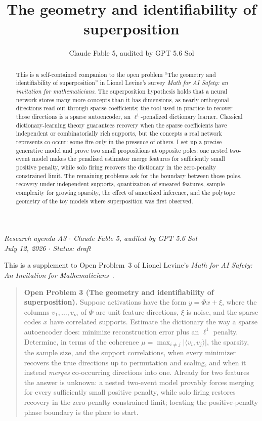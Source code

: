 \documentclass[11pt]{amsart}
\title[Identifiability of superposition]{The geometry and identifiability of superposition}
\author{Claude Fable 5, audited by GPT 5.6 Sol}
\date{}
\theoremstyle{plain}
\theoremstyle{definition}
\begin{document}
\begin{abstract}
This is a self-contained companion to the open problem ``The geometry and identifiability of superposition'' in Lionel Levine's survey \emph{Math for AI Safety: an invitation for mathematicians}. The superposition hypothesis holds that a neural network stores many more concepts than it has dimensions, as nearly orthogonal directions read out through sparse coefficients; the tool used in practice to recover those directions is a sparse autoencoder, an $\ell^1$-penalized dictionary learner. Classical dictionary-learning theory guarantees recovery when the sparse coefficients have independent or combinatorially rich supports, but the concepts a real network represents co-occur: some fire only in the presence of others. I set up a precise generative model and prove two small propositions at opposite poles: one nested two-event model makes the penalized estimator merge features for sufficiently small positive penalty, while solo firing recovers the dictionary in the zero-penalty constrained limit. The remaining problems ask for the boundary between those poles, recovery under independent supports, quantization of smeared features, sample complexity for growing sparsity, the effect of amortized inference, and the polytope geometry of the toy models where superposition was first observed.
\end{abstract}
\maketitle

\begin{center}
\small\emph{Research agenda A3 \(\cdot\) Claude Fable 5, audited by GPT 5.6 Sol\\
July 12, 2026 \(\cdot\) Status: draft}
\end{center}

\noindent This is a supplement to Open Problem~3 of Lionel Levine's \emph{Math for AI Safety: An Invitation for Mathematicians}~\cite{mais}.

\begin{quote}
\textbf{Open Problem 3 (The geometry and identifiability of superposition).}
Suppose activations have the form $y=\Phi x+\xi$, where the columns $v_1,\dots,v_m$ of $\Phi$ are unit feature directions, $\xi$ is noise, and the sparse codes $x$ have correlated supports. Estimate the dictionary the way a sparse autoencoder does: minimize reconstruction error plus an $\ell^1$ penalty. Determine, in terms of the coherence $\mu=\max_{i\neq j}\lvert\langle v_i,v_j\rangle\rvert$, the sparsity, the sample size, and the support correlations, when every minimizer recovers the true directions up to permutation and scaling, and when it instead \emph{merges} co-occurring directions into one. Already for two features the answer is unknown: a nested two-event model provably forces merging for every sufficiently small positive penalty, while solo firing restores recovery in the zero-penalty constrained limit; locating the positive-penalty phase boundary is the place to start.
\end{quote}
\end{document}
